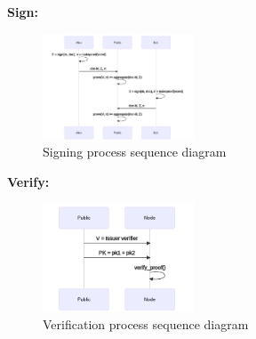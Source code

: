 \documentclass[twocolumn]{article}
\begin{document}
\textbf{Sign:}

\begin{figure}
  \caption{Signing process sequence diagram}
  \centering
  \includegraphics[width=0.4\textwidth]{sign-seq}
\end{figure}

\textbf{Verify:}

\begin{figure}
  \caption{Verification process sequence diagram}
  \centering
  \includegraphics[width=0.4\textwidth]{verify-seq}
\end{figure}
\end{document}
